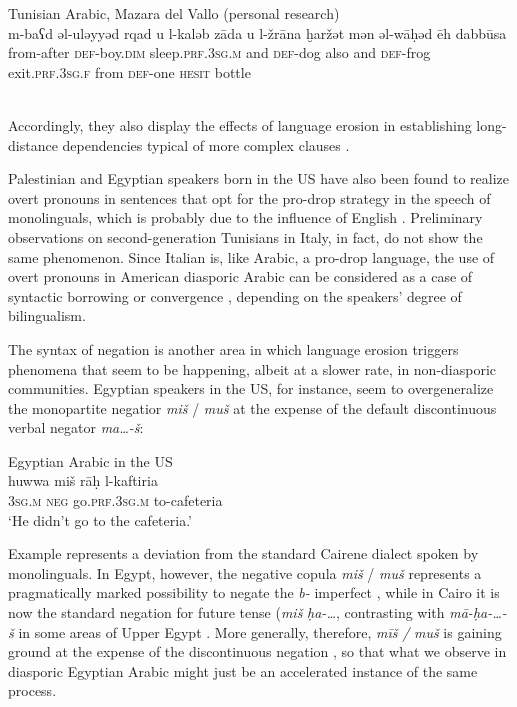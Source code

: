 \documentclass[output=paper]{langsci/langscibook}
\begin{document}
\ea
{Tunisian Arabic, Mazara del Vallo (personal research)}\\
\gll m-baʕd əl-uləyyəd rqad u l-kaləb zāda u l-žrāna ḫaržət mən əl-wāḥəd ēh dabbūsa\\
 from-after \textsc{def}-boy.\textsc{dim} sleep\textsc{.prf.3sg.m} and \textsc{def-}dog also and \textsc{def-}frog exit\textsc{.prf.3sg.f} from \textsc{def-}one \textsc{hesit} bottle\\
\\
\z

Accordingly, they also display the effects of language erosion in establishing long-distance dependencies typical of more complex clauses \citep[305]{Albirini2016}.

Palestinian and Egyptian speakers born in the US have also been found to realize overt pronouns in sentences that opt for the pro-drop strategy in the speech of monolinguals, which is probably due to the influence of English \citep[283]{AlbiriniSaadah2014}. Preliminary observations on second-generation Tunisians in Italy, in fact, do not show the same phenomenon. Since Italian is, like Arabic, a pro-drop language, the use of overt pronouns in American diasporic Arabic can be considered as a case of syntactic borrowing or convergence \citep{Lucas2015}, depending on the speakers’ degree of bilingualism.

The syntax of negation is another area in which language erosion triggers phenomena that seem to be happening, albeit at a slower rate, in non-diasporic communities. Egyptian speakers in the US, for instance, seem to overgeneralize the monopartite negatior \textit{miš} / \textit{muš} at the expense of the default discontinuous verbal negator \textit{ma…-š}: 

\ea\label{ex:key:egy}
{Egyptian Arabic in the US \citep[482]{AlbiriniBenmamoun2015}}\\
\gll huwwa miš rāḥ l-kaftiria\\
     \textsc{3sg.m} \textsc{neg} go.\textsc{prf.3sg.m} to-cafeteria\\
\glt `He didn’t go to the cafeteria.'
\z

Example  represents a deviation from the standard Cairene dialect spoken by monolinguals. In Egypt, however, the negative copula \textit{miš} / \textit{muš} represents a pragmatically marked possibility to negate the \textit{b-} imperfect \citep[302]{Brustad2000}, while in Cairo it is now the standard negation for future tense (\textit{miš} \textit{ḥa-…}, contrasting with \textit{mā-ḥa-…-š} in some areas of Upper Egypt \citep[285]{Brustad2000}. More generally, therefore,  \textit{mīš} \textit{/} \textit{muš} is gaining ground at the expense of the discontinuous negation \citep[285]{Brustad2000}, so that what we observe in diasporic Egyptian Arabic might just be an accelerated instance of the same process.
\end{document}
